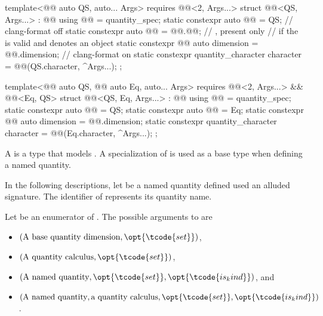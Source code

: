 \begin{codeblock}
{template<@@ auto QS, auto... Args>
  requires @@<2, Args...>
struct @@<QS, Args...> : @@ {
  using @@ = quantity_spec;
  static constexpr auto @@ = QS;  // clang-format off
  static constexpr auto @@ = @@.@@;  // \expos, present only
    // if the   is valid and denotes an object
  static constexpr @@ auto dimension = @@.dimension;  // clang-format on
  static constexpr quantity_character character =
    @@(QS.character, {^Args...});
};

template<@@ auto QS, @@ auto Eq, auto... Args>
  requires @@<2, Args...> && @@<Eq, QS>
struct @@<QS, Eq, Args...> : @@ {
  using @@ = quantity_spec;
  static constexpr auto @@ = QS;
  static constexpr auto @@ = Eq;
  static constexpr @@ auto dimension = @@.dimension;
  static constexpr quantity_character character =
    @@(Eq.character, {^Args...});
};

}
\end{codeblock}

\pnum
A  is a type that models .
A specialization of  is used as a base type when defining a named quantity.

\pnum
In the following descriptions, let  be a named quantity defined used an alluded signature.
The identifier of  represents its quantity name.

\pnum
Let  be an enumerator of .
The possible arguments to  are
\begin{itemize}
\item
$(\text{A base quantity dimension}, \opt{\tcode{set}})$,
\item
$(\text{A quantity calculus}, \opt{\tcode{set}})$,
\item
$(\text{A named quantity}, \opt{\tcode{set}}, \opt{\tcode{is_kind}})$, and
\item
$(\text{A named quantity}, \text{a quantity calculus}, \opt{\tcode{set}}, \opt{\tcode{is_kind}})$.
\end{itemize}

